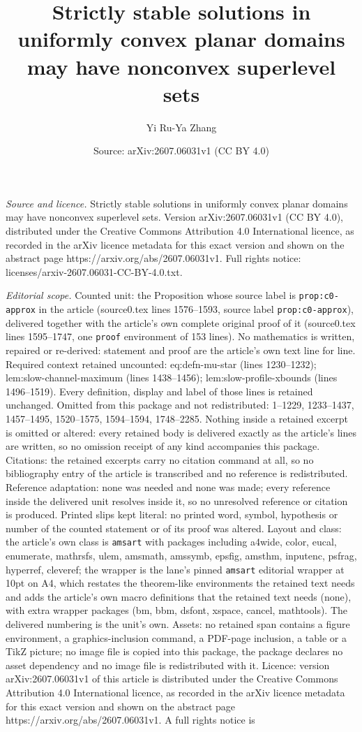 \documentclass[10pt,a4paper]{amsart}
\title[Strictly stable solutions in uniformly convex planar domains]{Strictly stable solutions in uniformly convex planar domains may have nonconvex superlevel sets}
\author{Yi Ru-Ya Zhang}
\date{Source: arXiv:2607.06031v1 (CC BY 4.0)}
\begin{document}
\maketitle

\noindent\emph{Source and licence.} Strictly stable solutions in uniformly convex planar domains may have nonconvex superlevel sets. Version arXiv:2607.06031v1 (CC BY 4.0), distributed under the Creative Commons Attribution 4.0 International licence, as recorded in the arXiv licence metadata for this exact version and shown on the abstract page https://arxiv.org/abs/2607.06031v1. Full rights notice: licenses/arxiv-2607.06031-CC-BY-4.0.txt.\par\smallskip

\noindent\textit{Editorial scope.} Counted unit: the Proposition whose source label is \texttt{prop:c0-approx} in the article (source0.tex lines 1576--1593, source label \texttt{prop:c0-approx}), delivered together with the article's own complete original proof of it (source0.tex lines 1595--1747, one \texttt{proof} environment of 153 lines). No mathematics is written, repaired or re-derived: statement and proof are the article's own text line for line. Required context retained uncounted: eq:defn-mu-star (lines 1230--1232); lem:slow-channel-maximum (lines 1438--1456); lem:slow-profile-xbounds (lines 1496--1519). Every definition, display and label of those lines is retained unchanged. Omitted from this package and not redistributed: 1--1229, 1233--1437, 1457--1495, 1520--1575, 1594--1594, 1748--2285. Nothing inside a retained excerpt is omitted or altered: every retained body is delivered exactly as the article's lines are written, so no omission receipt of any kind accompanies this package. Citations: the retained excerpts carry no citation command at all, so no bibliography entry of the article is transcribed and no reference is redistributed. Reference adaptation: none was needed and none was made; every reference inside the delivered unit resolves inside it, so no unresolved reference or citation is produced. Printed slips kept literal: no printed word, symbol, hypothesis or number of the counted statement or of its proof was altered. Layout and class: the article's own class is \texttt{amsart} with packages including a4wide, color, eucal, enumerate, mathrsfs, ulem, amsmath, amssymb, epsfig, amsthm, inputenc, psfrag, hyperref, cleveref; the wrapper is the lane's pinned \texttt{amsart} editorial wrapper at 10pt on A4, which restates the theorem-like environments the retained text needs and adds the article's own macro definitions that the retained text needs (none), with extra wrapper packages (bm, bbm, dsfont, xspace, cancel, mathtools). The delivered numbering is the unit's own. Assets: no retained span contains a figure environment, a graphics-inclusion command, a PDF-page inclusion, a table or a TikZ picture; no image file is copied into this package, the package declares no asset dependency and no image file is redistributed with it. Licence: version arXiv:2607.06031v1 of this article is distributed under the Creative Commons Attribution 4.0 International licence, as recorded in the arXiv licence metadata for this exact version and shown on the abstract page https://arxiv.org/abs/2607.06031v1. A full rights notice is 
\end{document}
